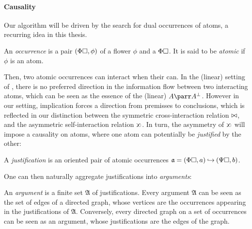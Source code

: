 \begin{scope}
\paragraph{Causality}

Our algorithm will be driven by the search for dual occurrences of atoms, a
recurring idea in this thesis.

\begin{definition}[Occurrence]
  
  An \emph{occurrence} is a pair $(\Phi\square, \phi)$ of a flower $\phi$ and a
   $\Phi\square$. It is said to be \emph{atomic} if $\phi$ is an atom.
\end{definition}

Then, two atomic occurrences can interact when their  can. In the
(linear)  setting of \cite{lmcs:1089}, there is no preferred direction
in the information flow between two interacting atoms, which can be seen as the
essence of the (linear)  $A \parr A^\bot$. However in our
 setting, implication forces a direction from premisses to
conclusions, which is reflected in our distinction between the symmetric
cross-interaction relation $\mathbin{\bowtie}$, and the asymmetric self-interaction
relation $\sinter$. In turn, the asymmetry of
$\sinter$ will impose a causality on atoms, where one atom can potentially be
\emph{justified} by the other:

\begin{definition}[Justification]
  
  A \emph{justification} is an oriented pair of atomic occurrences $\mathfrak{a}
  = (\Phi\square, a) \mathbin{\hookrightarrow} (\Psi\square, b)$.
\end{definition}

One can then naturally aggregate justifications into \emph{arguments}:

\begin{definition}[Argument]
  
  An \emph{argument} is a finite set $\mathfrak{A}$ of justifications. Every
  argument $\mathfrak{A}$ can be seen as the set of edges of a directed graph,
  whose vertices are the occurrences appearing in the justifications of
  $\mathfrak{A}$. Conversely, every directed graph on a set of occurrences can
  be seen as an argument, whose justifications are the edges of the graph.
\end{definition}


\end{scope}
